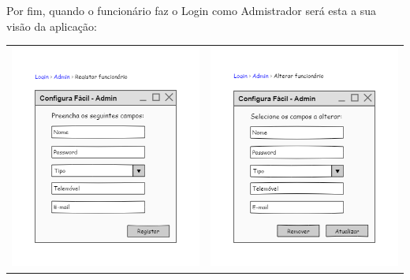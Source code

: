 \documentclass[11pt]{article} %
\begin{document}
Por fim, quando o funcionário faz o Login como Admistrador será esta a sua visão da aplicação:
\begin{center}
	\begin{table}[!htbp]
		\begin{tabular}{cc}
 			\includegraphics[width = 3in]{registar_funcionrio.png} & \includegraphics[width = 3in]{alterar_funcionrio.png}
		\end{tabular}
	\end{table}

\end{center}
\end{document}
